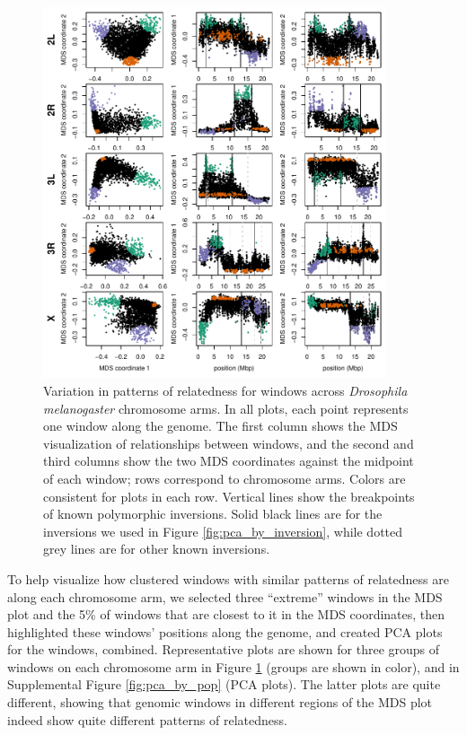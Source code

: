 \documentclass[11pt, oneside]{article}   	%
\begin{document}
\begin{figure}
    \begin{center}
       \includegraphics[width=0.9\textwidth]{Fig1_allchr_Together_MDS_plot_compact_with_ChrX_inv}
    \end{center}
    \caption{
        Variation in patterns of relatedness for windows across \textit{Drosophila melanogaster} chromosome arms.
        In all plots, each point represents one window along the genome.
         The first column shows the MDS visualization of relationships between windows, 
         and the second and third columns show 
        the two MDS coordinates
         against the midpoint of each window;
         rows correspond to chromosome arms.
         Colors are consistent for plots in each row. 
         Vertical lines show the breakpoints of known polymorphic inversions.   
         Solid black lines are for the inversions we used in Figure \ref{fig:pca_by_inversion},
         while dotted grey lines are for other known inversions.     
         \label{fig:mds_allchr}
    }
\end{figure}



To help visualize how clustered windows with similar patterns of relatedness are along each chromosome arm, 
we selected three ``extreme'' windows in the MDS plot
and the 5\% of windows that are closest to it in the MDS coordinates,
then highlighted these windows' positions along the genome,
and created PCA plots for the windows, combined.
Representative plots are shown for three groups of windows on each chromosome arm
in Figure \ref{fig:mds_allchr} (groups are shown in color),
and in Supplemental Figure \ref{fig:pca_by_pop} (PCA plots).
The latter plots are quite different,
showing that genomic windows in different regions of the MDS plot indeed show quite different patterns of relatedness.
\end{document}
